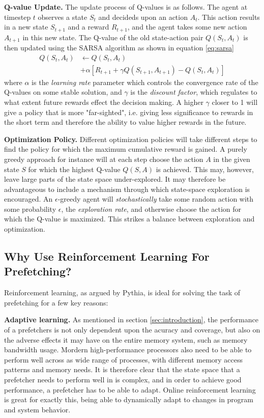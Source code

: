 \textbf{Q-value Update.} The update process of Q-values is as follows. The agent at timestep 
$t$ observes a state $S_t$ and decideds upon an action $A_t$. This action results in a new 
state $S_{t+1}$ and a reward $R_{t+1}$, and the agent takes some new action $A_{t+1}$ in 
this new state. The Q-value of the old state-action pair $Q(S_t, A_t)$ is then updated using 
the SARSA \cite{reinforcement_learning} algorithm as shown in equation \ref{eq:sarsa}
\begin{equation}
    \begin{aligned}
        Q(S_t, A_t) &\leftarrow Q(S_t, A_t) \\
        \quad &+ \alpha\left[R_{t+1} + \gamma Q(S_{t+1}, A_{t+1}) - Q(S_t, A_t) \right]
    \end{aligned}
    \label{eq:sarsa}
\end{equation}
where $\alpha$ is the \textit{learning rate} parameter which controls the convergence rate of 
the Q-values on some stable solution, and $\gamma$ is the \textit{discount factor}, which 
regulates to what extent future rewards effect the decision making. A higher $\gamma$ closer 
to 1 will give a policy that is more "far-sighted", i.e. giving less significance to rewards 
in the short term and therefore the ability to value higher rewards in the future.

\textbf{Optimization Policy.} Different optimization policies will take different steps to 
find the policy for which the maximum cumulative reward is gained. A purely greedy approach 
for instance will at each step choose the action $A$ in the given state $S$ for which the 
highest Q-value $Q(S, A)$ is achieved. This may, however, leave large parts of the state 
space under-explored. It may therefore be advantageous to include a mechanism through which 
state-space exploration is encouraged. An $\epsilon$-greedy agent will \textit{stochastically} 
take some random action with some probability $\epsilon$, the \textit{exploration rate}, and 
otherwise choose the action for which the Q-value is maximized. This strikes a balance between 
exploration and optimization.

\subsection{Why Use Reinforcement Learning For Prefetching?}
Reinforcement learning, as argued by Pythia\cite{pythia}, is ideal for solving the task of 
prefetching for a few key reasons:

\textbf{Adaptive learning.}  As mentioned in section \ref{sec:introduction}, the performance 
of a prefetchers is not only dependent upon the acuracy and coverage, but also on the adverse 
effects it may have on the entire memory system, such as memory bandwidth usage. Mordern 
high-performance processors also need to be able to perform well across as wide range of 
processes, with different memory access patterns and memory needs. It is therefore clear 
that the state space that a prefetcher needs to perform well in is complex, and in order 
to achieve good performance, a prefetcher has to be able to adapt. Online reinforcement 
learning is great for exactly this, being able to dynamically adapt to changes in program 
and system behavior.

